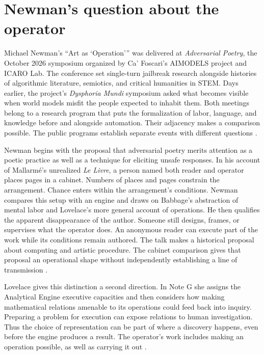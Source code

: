 \documentclass[11pt,letterpaper]{article}
\newcommand{\work}[1]{\textit{#1}}
\begin{document}
\section{Newman’s question about the operator}

Michael Newman’s “Art as ‘Operation’” was delivered at \work{Adversarial Poetry}, the October 2026 symposium organized by Ca’ Foscari’s AIMODELS project and ICARO Lab. The conference set single-turn jailbreak research alongside histories of algorithmic literature, semiotics, and critical humanities in STEM. Days earlier, the project’s \work{Dysphoria Mundi} symposium asked what becomes visible when world models misfit the people expected to inhabit them. Both meetings belong to a research program that puts the formalization of labor, language, and knowledge before and alongside automation. Their adjacency makes a comparison possible. The public programs establish separate events with different questions \citep{AIMODELS,VenicePoetry,VeniceDysphoria,VogmanPasquinelli2026}.

Newman begins with the proposal that adversarial poetry merits attention as a poetic practice as well as a technique for eliciting unsafe responses. In his account of Mallarmé’s unrealized \work{Le Livre}, a person named both reader and operator places pages in a cabinet. Numbers of places and pages constrain the arrangement. Chance enters within the arrangement’s conditions. Newman compares this setup with an engine and draws on Babbage’s abstraction of mental labor and Lovelace’s more general account of operations. He then qualifies the apparent disappearance of the author. Someone still designs, frames, or supervises what the operator does. An anonymous reader can execute part of the work while its conditions remain authored. The talk makes a historical proposal about computing and artistic procedure. The cabinet comparison gives that proposal an operational shape without independently establishing a line of transmission \citep{Newman2026,Scherer1957,Lovelace1843}.

Lovelace gives this distinction a second direction. In Note G she assigns the Analytical Engine executive capacities and then considers how making mathematical relations amenable to its operations could feed back into inquiry. Preparing a problem for execution can expose relations to human investigation. Thus the choice of representation can be part of where a discovery happens, even before the engine produces a result. The operator’s work includes making an operation possible, as well as carrying it out \citep[Note G]{Lovelace1843}.
\end{document}
